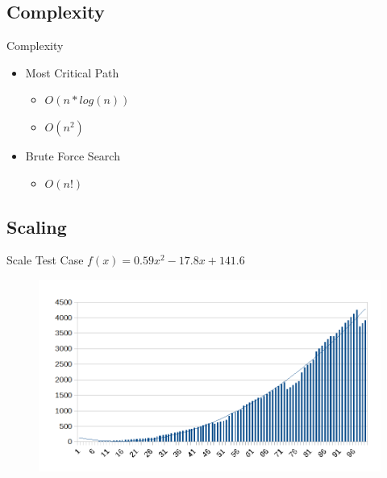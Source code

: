 \subsection{Complexity}
\begin{frame}{Complexity}
\begin{itemize}
\item Most Critical Path
\begin{itemize}
\item $O(n*log(n))$
\item $O(n^2)$
\end{itemize}
\item Brute Force Search
\begin{itemize}
\item $O(n!)$
\end{itemize}
\end{itemize}
\end{frame}

\subsection{Scaling}
\begin{frame}{Scale Test Case}
\centering
$f(x) = 0.59x^2 - 17.8x + 141.6$
\begin{figure}
    \centering
    \includegraphics[width=\textwidth]{Grafik/ScaleTestResult}
\end{figure}
\end{frame}

